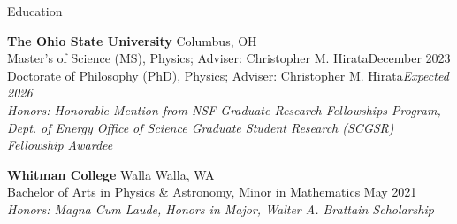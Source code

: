 \documentclass{resume} %
\begin{document}

\begin{rSection}{Education}

{\bf The Ohio State University} \hfill {Columbus, OH} 
\\ Master's of Science (MS), Physics; Adviser: Christopher M. Hirata\hfill{December 2023}
\\ Doctorate of Philosophy (PhD), Physics; Adviser: Christopher M. Hirata\hfill{\textit{Expected 2026}}
\\ \small{\textit{Honors: Honorable Mention from NSF Graduate Research Fellowships Program,}}
\\ \hspace{10pt}\small{\textit{Dept. of Energy Office of Science Graduate Student Research (SCGSR) Fellowship Awardee}}

{\bf Whitman College} \hfill {Walla Walla, WA} 
\\ Bachelor of Arts in Physics \& Astronomy, Minor in Mathematics \hfill {May 2021}
\\ \small{\textit{Honors: Magna Cum Laude, Honors in Major, Walter A. Brattain Scholarship}}

\end{rSection}



\end{document}
